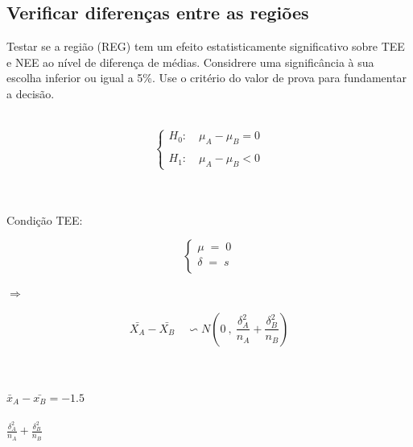 \subsection{Verificar diferenças entre as regiões}
\noindent
Testar se a região (REG) tem um efeito estatisticamente significativo sobre TEE e NEE ao nível de diferença de médias. Considrere uma significância à sua escolha inferior ou igual a 5\%. Use o critério do valor de prova para fundamentar a decisão.\\
\\
\begin{minipage}[l]{0pt}
$$\left\lbrace\begin{array}{l}
H_0: \quad \mu_A-\mu_B=0 \\
\\
H_1: \quad \mu_A-\mu_B<0
\end{array}\right.$$
\end{minipage}
\hspace{5cm} \\
\\
Condição TEE:\\
\begin{minipage}[l]{0pt}
$$\left\lbrace\begin{array}{c}
\mu \;=\; 0 \\
\delta \;=\; s \\
\end{array}\right.$$
\end{minipage}
\hspace{3cm} $\Longrightarrow$ \hspace{1cm}
\begin{minipage}[l]{0pt}
\[\bar{X_A}-\bar{X_B} \quad \backsim N \left( 0\:,\: \frac{\delta_A^2}{n_A}+\frac{\delta_B^2}{n_B} \right) \]
\end{minipage}\\
\\
$\bar{x}_A-\bar{x_B}=-1.5$ \\
\\
$ \frac{\delta_A^2}{n_A}+\frac{\delta_B^2}{n_B} $ \\
\\

